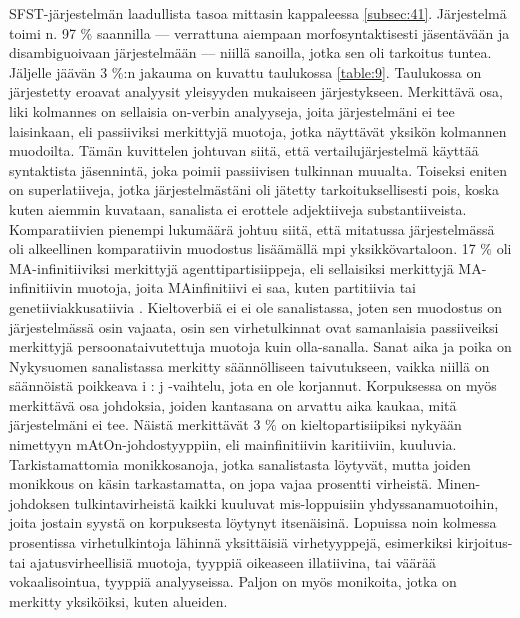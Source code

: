 \documentclass[free]{flammie}
\begin{document}
SFST-järjestelmän laadullista tasoa mittasin kappaleessa \ref{subsec:41}. Järjestelmä toimi n.
97 \% saannilla — verrattuna aiempaan morfosyntaktisesti jäsentävään ja disambiguoivaan järjestelmään — niillä sanoilla, jotka sen oli tarkoitus tuntea. Jäljelle
jäävän 3 \%:n jakauma on kuvattu taulukossa \ref{table:9}. Taulukossa on järjestetty eroavat analyysit yleisyyden mukaiseen järjestykseen. Merkittävä osa, liki kolmannes
on sellaisia on-verbin analyyseja, joita järjestelmäni ei tee laisinkaan, eli passiiviksi merkittyjä muotoja, jotka näyttävät yksikön kolmannen muodoilta. Tämän
kuvittelen johtuvan siitä, että vertailujärjestelmä käyttää syntaktista jäsennintä,
joka poimii passiivisen tulkinnan muualta. Toiseksi eniten on superlatiiveja, jotka järjestelmästäni oli jätetty tarkoituksellisesti pois, koska kuten aiemmin kuvataan, sanalista ei erottele adjektiiveja substantiiveista. Komparatiivien pienempi
lukumäärä johtuu siitä, että mitatussa järjestelmässä oli alkeellinen komparatiivin
muodostus lisäämällä mpi yksikkövartaloon. 17 \% oli MA-infinitiiviksi merkittyjä
agenttipartisiippeja, eli sellaisiksi merkittyjä MA-infinitiivin muotoja, joita MAinfinitiivi ei saa, kuten partitiivia tai genetiiviakkusatiivia \cite{hakulinen2008iso}.
Kieltoverbiä ei ei ole sanalistassa, joten sen muodostus on järjestelmässä osin vajaata, osin sen virhetulkinnat ovat samanlaisia passiiveiksi merkittyjä persoonataivutettuja muotoja kuin olla-sanalla. Sanat aika ja poika on Nykysuomen sanalistassa merkitty säännölliseen taivutukseen, vaikka niillä on säännöistä poikkeava i
: j -vaihtelu, jota en ole korjannut. Korpuksessa on myös merkittävä osa johdoksia,
joiden kantasana on arvattu aika kaukaa, mitä järjestelmäni ei tee. Näistä
merkittävät 3 \% on kieltopartisiipiksi nykyään nimettyyn mAtOn-johdostyyppiin, eli mainfinitiivin karitiiviin, kuuluvia. Tarkistamattomia monikkosanoja, jotka sanalistasta löytyvät, mutta joiden monikkous on käsin tarkastamatta, on jopa vajaa prosentti virheistä. Minen-johdoksen tulkintavirheistä kaikki kuuluvat mis-loppuisiin
yhdyssanamuotoihin, joita jostain syystä on korpuksesta löytynyt itsenäisinä. Lopuissa noin kolmessa prosentissa virhetulkintoja lähinnä yksittäisiä virhetyyppejä,
esimerkiksi kirjoitus- tai ajatusvirheellisiä muotoja, tyyppiä oikeaseen illatiivina,
tai väärää vokaalisointua, tyyppiä analyyseissa. Paljon on myös monikoita, jotka
on merkitty yksiköiksi, kuten alueiden.
\end{document}
